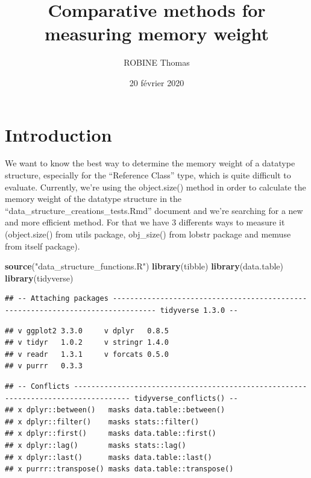\documentclass[
]{article}
\title{Comparative methods for measuring memory weight}
\author{ROBINE Thomas}
\date{20 février 2020}
\newenvironment{Shaded}{\begin{snugshade}}{\end{snugshade}}
\newcommand{\KeywordTok}[1]{\textcolor[rgb]{0.13,0.29,0.53}{\textbf{#1}}}
\newcommand{\NormalTok}[1]{#1}
\newcommand{\StringTok}[1]{\textcolor[rgb]{0.31,0.60,0.02}{#1}}
\begin{document}
\maketitle

\hypertarget{introduction}{%
\section{Introduction}\label{introduction}}

We want to know the best way to determine the memory weight of a
datatype structure, especially for the ``Reference Class'' type, which
is quite difficult to evaluate. Currently, we're using the object.size()
method in order to calculate the memory weight of the datatype structure
in the ``data\_structure\_creations\_tests.Rmd'' document and we're
searching for a new and more efficient method. For that we have 3
differents ways to measure it (object.size() from utils package,
obj\_size() from lobstr package and memuse from itself package).

\begin{Shaded}
\begin{Highlighting}[]
\KeywordTok{source}\NormalTok{(}\StringTok{"data_structure_functions.R"}\NormalTok{)}
\KeywordTok{library}\NormalTok{(tibble)}
\KeywordTok{library}\NormalTok{(data.table)}
\KeywordTok{library}\NormalTok{(tidyverse)}
\end{Highlighting}
\end{Shaded}

\begin{verbatim}
## -- Attaching packages -------------------------------------------------------------------------------- tidyverse 1.3.0 --
\end{verbatim}

\begin{verbatim}
## v ggplot2 3.3.0     v dplyr   0.8.5
## v tidyr   1.0.2     v stringr 1.4.0
## v readr   1.3.1     v forcats 0.5.0
## v purrr   0.3.3
\end{verbatim}

\begin{verbatim}
## -- Conflicts ----------------------------------------------------------------------------------- tidyverse_conflicts() --
## x dplyr::between()   masks data.table::between()
## x dplyr::filter()    masks stats::filter()
## x dplyr::first()     masks data.table::first()
## x dplyr::lag()       masks stats::lag()
## x dplyr::last()      masks data.table::last()
## x purrr::transpose() masks data.table::transpose()
\end{verbatim}
\end{document}

